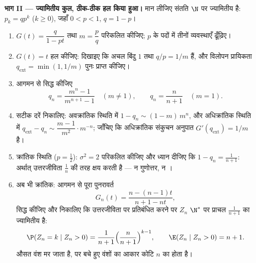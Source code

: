 \begin{problem}
\medskip
\noindent\textbf{भाग II --- ज्यामितीय कुल, ठीक-ठीक हल किया
हुआ।} मान लीजिए संतति  $\N$ पर ज्यामितीय है: $p_k =
qp^k$ ($k \geq 0$), जहाँ
$0 < p < 1$, $q = 1 - p$।
\begin{enumerate}[resume]
  \item $G(t) = \dfrac{q}{1 - pt}$ तथा $m = \dfrac
        pq$ परिकलित कीजिए; $p$ के पदों में तीनों
        व्यवस्थाएँ ढूँढ़िए।
  \item $G(t) = t$ हल कीजिए: दिखाइए कि अचल बिंदु $1$ तथा $q/p = 1/m$ हैं, और
        विलोपन प्रायिकता $q_{\mathrm{ext}} = \min(1, 1/m)$ पुनः प्राप्त कीजिए।
  \item आगमन से  सिद्ध कीजिए
        \[
        q_n = \frac{m^n - 1}{m^{n+1} - 1} \quad (m \neq 1),
        \qquad
        q_n = \frac{n}{n+1} \quad (m = 1).
        \]
  \item सटीक दरें निकालिए: अवक्रांतिक स्थिति में $1 - q_n \sim (1 - m)\,m^n$, और
        अधिक्रांतिक स्थिति में $q_{\mathrm{ext}} - q_n
        \sim \dfrac{m - 1}{m^{2}}\cdot m^{-n}$; जाँचिए कि अधिक्रांतिक
        संकुचन अनुपात $G'(q_{\mathrm{ext}}) = 1/m$ है।
  \item क्रांतिक स्थिति ($p = \tfrac12$): $\sigma^2 =
        2$ परिकलित कीजिए और ध्यान
        दीजिए कि $1 - q_n = \frac1{n+1}$: अर्थात् उत्तरजीविता $\frac1n$ की तरह क्षय
        करती है --- न गुणोत्तर, न ।
  \item अब भी क्रांतिक: आगमन से पूरा पुनरावर्त
        \[
        G_n(t) = \frac{n - (n-1)t}{n + 1 - nt},
        \]
        सिद्ध कीजिए और निकालिए कि उत्तरजीविता पर प्रतिबंधित
        करने पर $Z_n$ $\N^*$ पर प्राचल $\frac1{n+1}$ का ज्यामितीय है:
        \[
        \P(Z_n = k \mid Z_n > 0) = \frac1{n+1}
        \Bigl(\frac{n}{n+1}\Bigr)^{k-1},
        \qquad
        \E(Z_n \mid Z_n > 0) = n + 1 .
        \]
        औसत वंश मर जाता है, पर बचे हुए वंशों का आकार कोटि $n$
        का होता है।
\end{enumerate}


\end{problem}
